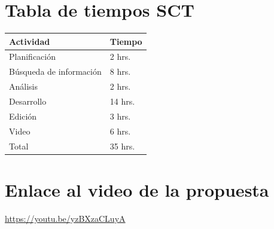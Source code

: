 \documentclass[conference,compsoc]{IEEEtran}
\begin{document}
\section{Tabla de tiempos SCT}

\begin{table}[h]
    \begin{tabular}{|l|l|}
        \hline
        Actividad                   & Tiempo    \\ \hline
        Planificación               & 2  hrs.    \\ \hline
        Búsqueda de información     & 8  hrs.    \\ \hline
        Análisis                    & 2  hrs.    \\ \hline
        Desarrollo                  & 14 hrs.    \\ \hline
        Edición                     & 3  hrs.    \\ \hline
        Video                       & 6  hrs.    \\ \hline
        Total                       & 35  hrs.    \\ \hline
    \end{tabular}
\end{table}

\section{Enlace al video de la propuesta}

\url{https://youtu.be/yzBXzaCLuyA}
\end{document}
